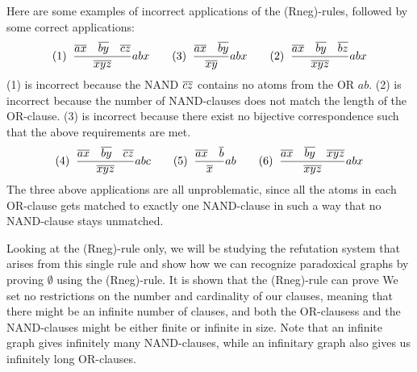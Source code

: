 Here are some examples of incorrect applications of the (Rneg)-rules, followed by some correct applications:
\begin{align}
  (1)\;\;\frac{\overline{ax}\quad\overline{by}\quad\overline{cz}}{\overline{xyz}}abx\quad\quad
  (3)\;\;\frac{\overline{ax}\quad\overline{by}}{\overline{xy}}abx\quad\quad
  (2)\;\;\frac{\overline{ax}\quad\overline{by}\quad\overline{bz}}{\overline{xyz}}abx
\end{align}
(1) is incorrect because the NAND $\overline{cz}$ contains no atoms from the OR $ab$.
(2) is incorrect because the number of NAND-clauses does not match the length of the OR-clause.
(3) is incorrect because there exist no bijective correspondence such that the above requirements are met.
\begin{align}
  (4)\;\;\frac{\overline{ax}\quad\overline{by}\quad\overline{cz}}{\overline{xyz}}abc\quad\quad
  (5)\;\;\frac{\overline{ax}\quad\overline{b}}{\overline{x}}ab\quad\quad
  (6)\;\;\frac{\overline{ax}\quad\overline{by}\quad\overline{xyz}}{\overline{xyz}}abx
\end{align}
The three above applications are all unproblematic, since all the atoms in each OR-clause gets matched to exactly one NAND-clause in such a way that no NAND-clause stays unmatched.

Looking at the (Rneg)-rule only, we will be studying the refutation system that arises from this single rule and show how we can recognize paradoxical graphs by proving $\emptyset$ using the (Rneg)-rule.
It is shown that the (Rneg)-rule can prove
We set no restrictions on the number and cardinality of our clauses, meaning that there might be an infinite number of clauses, and both the OR-clausess and the NAND-clauses might be either finite or infinite in size.
Note that an infinite graph gives infinitely many NAND-clauses, while an infinitary graph also gives us infinitely long OR-clauses.
